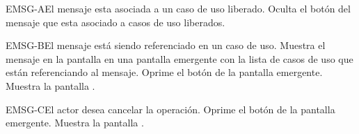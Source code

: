 	\begin{UCtrayectoriaA}{EMSG-A}{El mensaje esta asociada a un caso de uso liberado.}
		\UCpaso[\UCsist] Oculta el botón \eliminar del mensaje que esta asociado a casos de uso liberados.
	\end{UCtrayectoriaA}

	\begin{UCtrayectoriaA}{EMSG-B}{El mensaje está siendo referenciado en un caso de uso.}
		\UCpaso[\UCsist] Muestra el mensaje  en la pantalla  en una pantalla emergente con la lista de casos de uso que están referenciando al mensaje.
		\UCpaso[\UCactor] Oprime el botón  de la pantalla emergente.
		\UCpaso[\UCsist] Muestra la pantalla .
	\end{UCtrayectoriaA}

	\begin{UCtrayectoriaA}{EMSG-C}{El actor desea cancelar la operación.}
		\UCpaso[\UCactor] Oprime el botón  de la pantalla emergente.
		\UCpaso[\UCsist] Muestra la pantalla .
	\end{UCtrayectoriaA}
	

